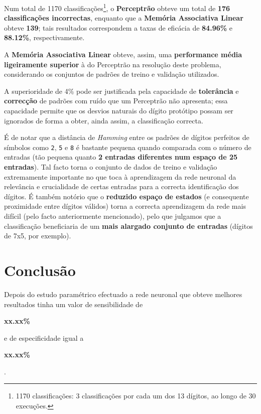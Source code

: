 \documentclass{article}
\newenvironment{text-red}{\color{red}}{}
\begin{document}
Num total de 1170 classificações\footnote{1170 classificações: 3 classificações por cada um dos 13 dígitos, ao longo de 30 execuções.}, o \textbf{Perceptrão} obteve um total de \textbf{176 classificações incorrectas}, enquanto que a \textbf{Memória Associativa Linear} obteve \textbf{139}; tais resultados correspondem a taxas de eficácia de \textbf{84.96\%} e \textbf{88.12\%}, respectivamente.

A \textbf{Memória Associativa Linear} obteve, assim, uma \textbf{performance média ligeiramente superior} à do Perceptrão na resolução deste problema, considerando os conjuntos de padrões de treino e validação utilizados.

A superioridade de 4\% pode ser justificada pela capacidade de \textbf{tolerância} e \textbf{correcção} de padrões com ruído que um Perceptrão não apresenta; essa capacidade permite que os desvios naturais do dígito protótipo possam ser ignorados de forma a obter, ainda assim, a classificação correcta.

É de notar que a distância de \textit{Hamming} entre os padrões de dígitos perfeitos de símbolos como \texttt{2}, \texttt{5} e \texttt{8} é bastante pequena quando comparada com o número de entradas (tão pequena quanto \textbf{2 entradas diferentes num espaço de 25 entradas}). Tal facto torna o conjunto de dados de treino e validação extremamente importante no que toca à aprendizagem da rede neuronal da relevância e crucialidade de certas entradas para a correcta identificação dos dígitos. É também notório que o \textbf{reduzido espaço de estados} (e consequente proximidade entre dígitos válidos) torna a correcta aprendizagem da rede mais difícil (pelo facto anteriormente mencionado), pelo que julgamos que a classificação beneficiaria de um \textbf{mais alargado conjunto de entradas} (dígitos de 7x5, por exemplo).

\clearpage
\section{Conclusão}
\indent \indent Depois do estudo paramétrico efectuado a rede neuronal que obteve melhores resultados tinha um valor de sensibilidade de \begin{text-red}\textbf{xx.xx\%}\end{text-red} e de especificidade igual a \begin{text-red}\textbf{xx.xx\%}\end{text-red}.
\end{document}
